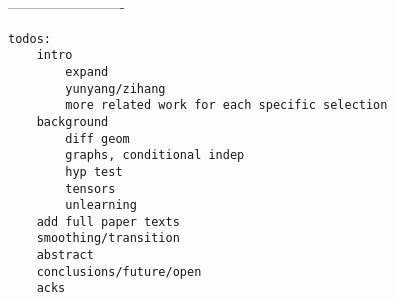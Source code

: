 




-------------------------

\begin{verbatim}
todos:
    intro
        expand
        yunyang/zihang
        more related work for each specific selection
    background
        diff geom
        graphs, conditional indep
        hyp test
        tensors
        unlearning
    add full paper texts
    smoothing/transition
    abstract
    conclusions/future/open
    acks
\end{verbatim}

